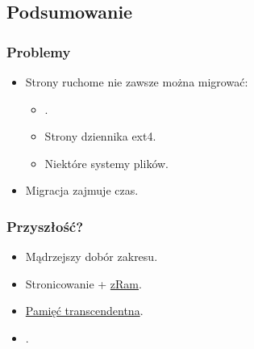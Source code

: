 
\subsection{Podsumowanie}

\begin{frame}
  \frametitle{Problemy}

  \begin{itemize}
  \item Strony ruchome nie zawsze można migrować:
    \begin{itemize}
    \item {}.
    \item Strony dziennika ext4.
    \item Niektóre systemy plików.
    \end{itemize}
  \item Migracja zajmuje czas.
  \end{itemize}
\end{frame}

\begin{frame}
  \frametitle{Przyszłość?}
  \begin{itemize}
  \item Mądrzejszy dobór zakresu.
  \end{itemize}

  \begin{itemize}
  \item Stronicowanie + \href{http://code.google.com/p/compcache}{zRam}.
  \item \href{http://lwn.net/Articles/340080/}{Pamięć transcendentna}.
  \item \href{http://lwn.net/Articles/468896/}{}.
  \end{itemize}
\end{frame}
